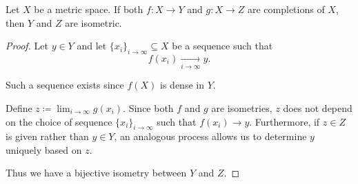 \begin{proposition}\label{thm:metric_space_completion_uniqueness}
  Let \( X \) be a metric space. If both \( f: X \to Y \) and \( g: X \to Z \) are completions of \( X \), then \( Y \) and \( Z \) are isometric.
\end{proposition}
\begin{proof}
  Let \( y \in Y \) and let \( \{ x_i \}_{i \to \infty} \subseteq X \) be a sequence such that
  \begin{equation*}
    f(x_i) \xrightarrow[i \to \infty]{} y.
  \end{equation*}

  Such a sequence exists since \( f(X) \) is dense in \( Y \).

  Define \( z \coloneqq \lim_{i \to \infty} g(x_i) \). Since both \( f \) and \( g \) are isometries, \( z \) does not depend on the choice of sequence \( \{ x_i \}_{i \to \infty} \) such that \( f(x_i) \to y \). Furthermore, if \( z \in Z \) is given rather than \( y \in Y \), an analogous process allows us to determine \( y \) uniquely based on \( z \).

  Thus we have a bijective isometry between \( Y \) and \( Z \).
\end{proof}
